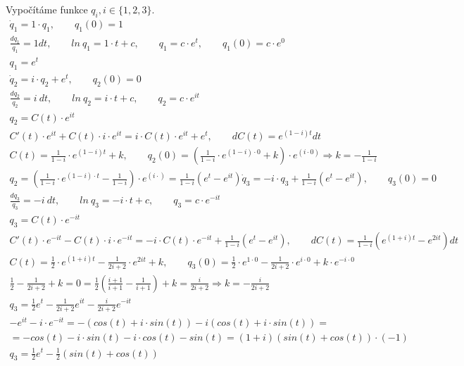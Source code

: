  Vypočítáme funkce $q_i, i\in\{1,2,3\}$.
\begin{equation*}
  \begin{array}{l}
    \dot{q}_1 = 1\cdot q_1, \qquad q_1(0) = 1\\
    \frac{dq_1}{q_1} = 1 dt, \qquad ln~q_1 = 1 \cdot t + c, \qquad q_1 = c \cdot e^t, \qquad q_1(0) = c \cdot e^0\\
    q_1 = e^t\\
    \dot{q}_2 = i\cdot q_2 + e^t, \qquad q_2(0) = 0\\
    \frac{dq_2}{q_2} = i~dt, \qquad ln~q_2 = i \cdot t + c, \qquad q_2 = c \cdot e^{it}\\
    q_2 = C(t) \cdot e^{it}\\
    C'(t) \cdot e^{it} + C(t) \cdot i \cdot e^{it}= i\cdot C(t) \cdot e^{it} + e^t, \qquad dC(t) = e^{(1-i)t}dt\\
    C(t) = \frac{1}{1-i}\cdot e^{(1-i)t} + k, \qquad q_2(0) = \left(\frac{1}{1-i}\cdot e^{(1-i)\cdot 0} + k\right)\cdot e^{(i\cdot 0)} \Rightarrow k = -\frac{1}{1 - i}\\
    q_2 =  \left(\frac{1}{1-i}\cdot e^{(1-i)\cdot t} -\frac{1}{1 - i}\right)\cdot e^{(i\cdot )} = \frac{1}{1 - i}\left( e^t - e^{it}\right)
    \dot{q}_3 = -i\cdot q_3 + \frac{1}{1 - i}\left( e^t - e^{it}\right), \qquad q_3(0) = 0\\
    \frac{dq_3}{q_3} = -i~dt, \qquad ln~q_3 = -i \cdot t + c, \qquad q_3 = c \cdot e^{-it}\\
    q_3 = C(t) \cdot e^{-it}\\
    C'(t) \cdot e^{-it} - C(t) \cdot i \cdot e^{-it}= -i\cdot C(t) \cdot e^{-it} + \frac{1}{1 - i}\left( e^t - e^{it}\right), \qquad dC(t) = \frac{1}{1 - i}\left( e^{(1 + i)t} - e^{2it}\right)dt\\
    C(t) = \frac{1}{2}\cdot e^{(1+i)t} - \frac{1}{2i + 2}\cdot e^{2it} + k, \qquad q_3(0) = \frac{1}{2}\cdot e^{1\cdot 0} - \frac{1}{2i + 2}\cdot e^{i\cdot 0} + k\cdot e^{-i\cdot 0}\\
    \frac{1}{2} - \frac{1}{2i + 2} + k = 0 = \frac{1}{2}\left( \frac{i + 1}{i + 1} - \frac{1}{i + 1}\right) + k = \frac{i}{2i + 2} \Rightarrow k = -\frac{i}{2i + 2}\\
    q_3 =  \frac{1}{2}e^t - \frac{1}{2i + 2}e^{it} - \frac{i}{2i + 2}e^{-it}\\
    -e^{it} - i\cdot e^{-it} = -(cos(t) + i\cdot sin(t)) - i(cos(t) + i\cdot sin(t)) =\\
    = -cos(t) - i\cdot sin(t) - i\cdot cos(t) - sin(t) = (1 + i)(sin(t) + cos(t))\cdot (-1)\\
    q_3 = \frac{1}{2}e^t -\frac{1}{2}(sin(t) + cos(t))
  \end{array}
\end{equation*}
